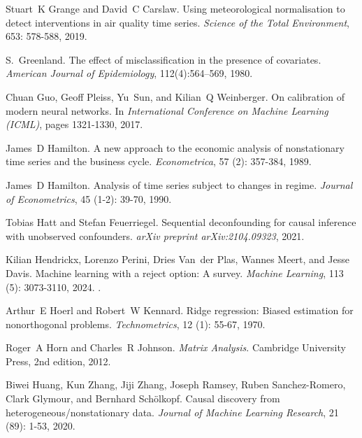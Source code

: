 Stuart~K Grange and David~C Carslaw.
\newblock Using meteorological normalisation to detect interventions in air quality time series.
\newblock \emph{Science of the Total Environment}, 653: 578-588, 2019.

S.~Greenland.
\newblock The effect of misclassification in the presence of covariates.
\newblock \emph{American Journal of Epidemiology}, 112(4):564--569, 1980.

Chuan Guo, Geoff Pleiss, Yu~Sun, and Kilian~Q Weinberger.
\newblock On calibration of modern neural networks.
\newblock In \emph{International Conference on Machine Learning (ICML)}, pages 1321-1330, 2017.

James~D Hamilton.
\newblock A new approach to the economic analysis of nonstationary time series and the business cycle.
\newblock \emph{Econometrica}, 57 (2): 357-384, 1989.

James~D Hamilton.
\newblock Analysis of time series subject to changes in regime.
\newblock \emph{Journal of Econometrics}, 45 (1-2): 39-70, 1990.

Tobias Hatt and Stefan Feuerriegel.
\newblock Sequential deconfounding for causal inference with unobserved confounders.
\newblock \emph{arXiv preprint arXiv:2104.09323}, 2021.

Kilian Hendrickx, Lorenzo Perini, Dries Van~der Plas, Wannes Meert, and Jesse Davis.
\newblock Machine learning with a reject option: A survey.
\newblock \emph{Machine Learning}, 113 (5): 3073-3110, 2024.
\newblock {}.

Arthur~E Hoerl and Robert~W Kennard.
\newblock Ridge regression: Biased estimation for nonorthogonal problems.
\newblock \emph{Technometrics}, 12 (1): 55-67, 1970.

Roger~A Horn and Charles~R Johnson.
\newblock \emph{Matrix Analysis}.
\newblock Cambridge University Press, 2nd edition, 2012.

Biwei Huang, Kun Zhang, Jiji Zhang, Joseph Ramsey, Ruben Sanchez-Romero, Clark Glymour, and Bernhard Sch{\"o}lkopf.
\newblock Causal discovery from heterogeneous/nonstationary data.
\newblock \emph{Journal of Machine Learning Research}, 21 (89): 1-53, 2020.

